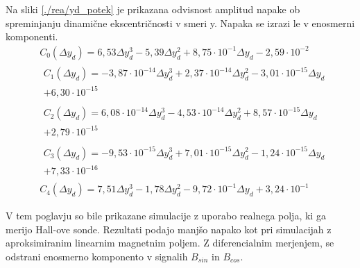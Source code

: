 Na sliki \ref{./rea/yd_potek} je prikazana odvisnost amplitud napake ob spreminjanju dinamične ekscentričnosti v smeri y. Napaka se izrazi le v enosmerni komponenti.
\begin{eqnarray}
&C_0(\Delta y_d) =6,53\Delta y_d^{3}-5,39\Delta y_d^{2}+8,75\cdot 10^{-1}\Delta y_d-2,59\cdot 10^{-2} \\                               
&\begin{split}C_1(\Delta y_d) =-3,87\cdot 10^{-14}\Delta y_d^{3}+2,37\cdot 10^{-14}\Delta y_d^{2}-3,01\cdot 10^{-15}\Delta y_d\\+6,30\cdot 10^{-15}\end{split} \\
&\begin{split}C_2(\Delta y_d) =6,08\cdot 10^{-14}\Delta y_d^{3}-4,53\cdot 10^{-14}\Delta y_d^{2}+8,57\cdot 10^{-15}\Delta y_d\\+2,79\cdot 10^{-15}\end{split} \\ 
&\begin{split}C_3(\Delta y_d) =-9,53\cdot 10^{-15}\Delta y_d^{3}+7,01\cdot 10^{-15}\Delta y_d^{2}-1,24\cdot 10^{-15}\Delta y_d\\+7,33\cdot 10^{-16}\end{split} \\
&C_4(\Delta y_d) =7,51\Delta y_d^{3}-1,78\Delta y_d^{2}-9,72\cdot 10^{-1}\Delta y_d+3,24\cdot 10^{-1}        
\end{eqnarray}

V tem poglavju so bile prikazane simulacije z uporabo realnega polja, ki ga merijo Hall-ove sonde. Rezultati podajo manjšo napako kot pri simulacijah z aproksimiranim linearnim magnetnim poljem. Z diferencialnim merjenjem, se odstrani enosmerno komponento v signalih $B_{sin}$ in $B_{cos}$.